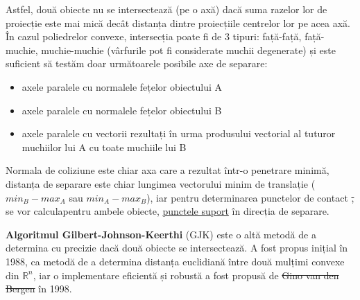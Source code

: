 \documentclass[12pt,a4paper]{report}
\providecommand{\DIFaddtex}[1]{{\protect\color{blue}\uwave{#1}}} %
\providecommand{\DIFdeltex}[1]{{\protect\color{red}\sout{#1}}}                      %
\providecommand{\DIFaddbegin}{} %
\providecommand{\DIFaddend}{} %
\providecommand{\DIFdelbegin}{} %
\providecommand{\DIFdelend}{} %
\providecommand{\DIFadd}[1]{\texorpdfstring{\DIFaddtex{#1}}{#1}} %
\providecommand{\DIFdel}[1]{\texorpdfstring{\DIFdeltex{#1}}{}} %
\newcommand{\DIFscaledelfig}{0.5}
\newlength{\DIFdelgraphicswidth} %
\newlength{\DIFdelgraphicsheight} %
\newcommand{\DIFaddincludegraphics}[2][]{{\color{blue}\fbox{\DIFOincludegraphics[#1]{#2}}}} %
\newcommand{\DIFdelincludegraphics}[2][]{%
	\sbox{\DIFdelgraphicsbox}{\DIFOincludegraphics[#1]{#2}}%
	\settoboxwidth{\DIFdelgraphicswidth}{\DIFdelgraphicsbox} %
	\settoboxtotalheight{\DIFdelgraphicsheight}{\DIFdelgraphicsbox} %
	\scalebox{\DIFscaledelfig}{%
		\parbox[b]{\DIFdelgraphicswidth}{\usebox{\DIFdelgraphicsbox}\\[-\baselineskip] \rule{\DIFdelgraphicswidth}{0em}}\llap{\resizebox{\DIFdelgraphicswidth}{\DIFdelgraphicsheight}{%
				\setlength{\unitlength}{\DIFdelgraphicswidth}%
				\begin{picture}(1,1)%
				\thicklines\linethickness{2pt} %
				{\color[rgb]{1,0,0}\put(0,0){\framebox(1,1){}}}%
				{\color[rgb]{1,0,0}\put(0,0){\line( 1,1){1}}}%
				{\color[rgb]{1,0,0}\put(0,1){\line(1,-1){1}}}%
				\end{picture}%
			}\hspace*{3pt}}} %
} %
\DeclareRobustCommand{\DIFaddbegin}{\DIFOaddbegin \let\includegraphics\DIFaddincludegraphics} %
\DeclareRobustCommand{\DIFaddend}{\DIFOaddend \let\includegraphics\DIFOincludegraphics} %
\DeclareRobustCommand{\DIFdelbegin}{\DIFOdelbegin \let\includegraphics\DIFdelincludegraphics} %
\DeclareRobustCommand{\DIFdelend}{\DIFOaddend \let\includegraphics\DIFOincludegraphics} %
\begin{document}
	Astfel, două obiecte nu se intersectează (pe o axă) dacă suma razelor lor de proiecție este mai mică decât distanța dintre proiecțiile centrelor lor pe acea axă. În cazul poliedrelor convexe, intersecția poate fi de 3 tipuri: față-față, față-muchie, muchie-muchie (vârfurile pot fi considerate muchii degenerate) și este suficient să testăm doar următoarele posibile axe de separare:
	\begin{itemize}
		\item axele paralele cu normalele fețelor obiectului A
		\item axele paralele cu normalele fețelor obiectului B
		\item axele paralele cu vectorii rezultați în urma produsului vectorial al tuturor muchiilor lui A cu toate muchiile lui B
	\end{itemize}
	Normala de coliziune este chiar axa care a rezultat într-o penetrare minimă, distanța de separare este chiar lungimea vectorului minim de translație ($min_B - max_A$ sau $min_A - max_B$), iar pentru determinarea punctelor de contact \DIFdelbegin \DIFdel{, }\DIFdelend se vor calcula\DIFaddbegin \DIFadd{, }\DIFaddend pentru ambele obiecte, \hyperref[support_points]{punctele suport} în direcția de separare.
	
	
	\textbf{Algoritmul Gilbert-Johnson-Keerthi} (GJK) este o altă metodă de a determina cu precizie dacă două obiecte se intersectează. A fost propus inițial în 1988\cite{gjk_original}, ca metodă de a determina distanța euclidiană între două mulțimi convexe din $\mathbb{R}^n$, iar o implementare eficientă și robustă a fost propusă de \DIFdelbegin \DIFdel{Gino van den Bergen }\DIFdelend \DIFaddbegin \textit{\DIFadd{Gino van den Bergen}} \DIFaddend în 1998\cite{gjk_gino}.
	\DIFaddbegin 
	
\end{document}
